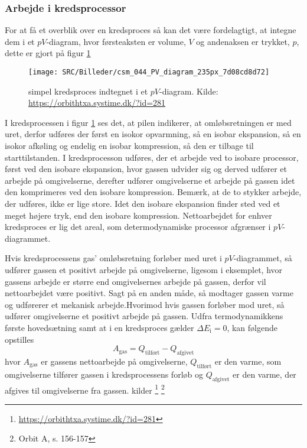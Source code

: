 \documentclass[12pt,a4paper]{article}
\begin{document}
			\subsubsection{Arbejde i kredsprocessor}
			For at få et overblik over en kredsproces så kan det være fordelagtigt, at 
			integne dem i et \(pV\)-diagram, hvor førsteaksten er volume, \(V\) og 
			andenaksen er trykket, \(p\), dette er gjort på figur \ref{fig:csm044pvdiagram235px7d08cd8d72}
			\begin{figure}[h!]
				\centering
				\texttt{[image: SRC/Billeder/csm\_044\_PV\_diagram\_235px\_7d08cd8d72]}
				\caption{simpel kredsproces indtegnet i et \(pV\)-diagram. Kilde: \url{https://orbithtxa.systime.dk/?id=281}}
				\label{fig:csm044pvdiagram235px7d08cd8d72}
			\end{figure}
			I kredsprocessen i figur \ref{fig:csm044pvdiagram235px7d08cd8d72} ses det, at pilen indikerer, at omløbsretningen er med uret, derfor udføres der
			først en isokor opvarmning, så en isobar ekspansion, så en isokor afkøling og
			endelig en isobar kompression, så den er tilbage til starttilstanden. I 
			kredsprocesson udføres, der et arbejde ved to isobare processor, først ved
			den isobare ekspansion, hvor gassen udvider sig og derved udfører et arbejde
			på omgivelserne, derefter udfører omgivelserne et arbejde på gassen idet den 
			komprimeres ved den isobare kompression. Bemærk, at de to stykker arbejde, der
			udføres, ikke er lige store. Idet den isobare ekspansion finder sted ved et meget
			højere tryk, end den isobare kompression. Nettoarbejdet for enhver kredsproces er
			lig det areal, som determodynamiske processor afgrænser i \(pV\)-diagrammet. 
			
			Hvis kredsprocessens gas' omløbsretning forløber med uret i \(pV\)-diagrammet, 
			så udfører gassen et positivt arbejde på omgivelserne, ligesom i eksemplet, 
			hvor gassens arbejde er større end omgivelsernes arbejde på gassen, derfor vil 
			nettoarbejdet være positivt. Sagt på en anden måde, så modtager gassen varme og 
			udførerer et mekanisk arbejde.Hvorimod hvis gassen forløber mod uret, så udfører 
			omgivelserne et positivt arbejde på gassen. Udfra termodynamikkens første 
			hovedsætning samt at i en kredsproces gælder \(\Delta E_\text{i} = 0\), kan 
			følgende opstilles
			\begin{equation}
				A_{\text{gas}} = Q_{\text{tilført}} - Q_{\text{afgivet}}
			\end{equation} 
			hvor \(A_{\text{gas}}\) er gassens nettoarbejde på omgivelserne, 
			\(Q_{\text{tilført}}\) er den varme, som omgivelserne tilfører gassen i 
			kredsprocessens forløb og \(Q_{\text{afgivet}}\) er den varme, der afgives 
			til omgivelserne fra gassen. kilder \footnote{\url{https://orbithtxa.systime.dk/?id=281}}
			\footnote{Orbit A, s. 156-157}
			
\end{document}
